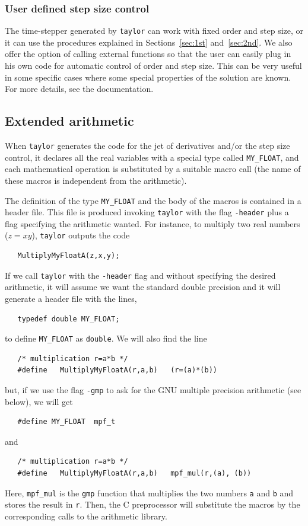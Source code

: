\documentclass[12pt,twoside]{article}
\begin{document}
\subsubsection{User defined step size control}
The time-stepper generated by \texttt{taylor} can work with fixed
order and step size, or it can use the procedures explained in
Sections~\ref{sec:1st} and~\ref{sec:2nd}. We also offer the option of
calling external functions so that the user can easily plug in his own
code for automatic control of order and step size. This can be very
useful in some specific cases where some special properties of the
solution are known. For more details, see the documentation.

\subsection{Extended arithmetic}
When \texttt{taylor} generates the code for the jet of derivatives
and/or the step size control, it declares all the real variables with
a special type called \texttt{MY\_FLOAT}, and each mathematical
operation is substituted by a suitable macro call (the name of these
macros is independent from the arithmetic).

The definition of the type \texttt{MY\_FLOAT} and the body of the
macros is contained in a header file. This file is produced invoking
\texttt{taylor} with the flag \texttt{-header} plus a flag specifying
the arithmetic wanted. For instance, to multiply two real numbers
($z=xy$), \texttt{taylor} outputs the code
\begin{verbatim}
   MultiplyMyFloatA(z,x,y);
\end{verbatim}
If we call \texttt{taylor} with the \texttt{-header} flag and without
specifying the desired arithmetic, it will assume we want the standard
double precision and it will generate a header file with the lines,
\begin{verbatim}
   typedef double MY_FLOAT;
\end{verbatim}
to define \texttt{MY\_FLOAT} as \texttt{double}. We will also find the
line
\begin{verbatim}
   /* multiplication r=a*b */
   #define   MultiplyMyFloatA(r,a,b)   (r=(a)*(b))
\end{verbatim}
but, if we use the flag \texttt{-gmp} to ask for the GNU multiple
precision arithmetic (see below), we will get
\begin{verbatim}
   #define MY_FLOAT  mpf_t
\end{verbatim}
and
\begin{verbatim}
   /* multiplication r=a*b */
   #define   MultiplyMyFloatA(r,a,b)   mpf_mul(r,(a), (b))
\end{verbatim}
Here, {\tt mpf\_mul} is the {\tt gmp} function that multiplies the two
numbers {\tt a} and {\tt b} and stores the result in {\tt r}. Then,
the C preprocessor will substitute the macros by the corresponding
calls to the arithmetic library.
\end{document}
